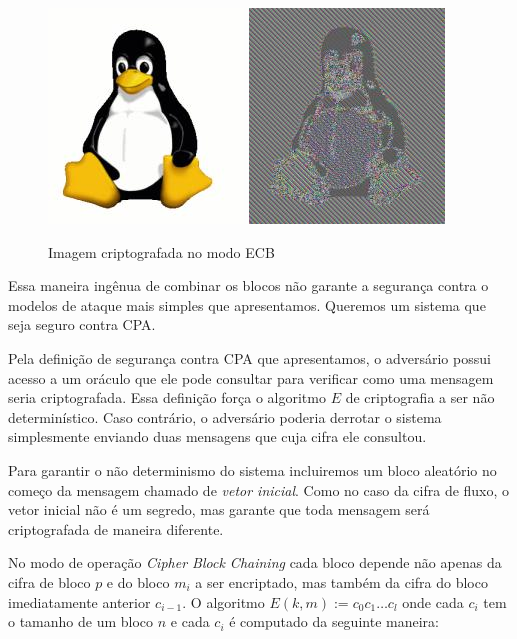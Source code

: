 
\begin{figure}[!htp]
  \centering
  \includegraphics[width=.3\textwidth]{imagens/Tux.jpg}
  \includegraphics[width=.3\textwidth]{imagens/Tux_ecb.jpg}
  \caption{Imagem criptografada no modo ECB}
\end{figure}

Essa maneira ingênua de combinar os blocos não garante a segurança contra o modelos de ataque mais simples que apresentamos.
Queremos um sistema que seja seguro contra CPA.

Pela definição de segurança contra CPA que apresentamos, o adversário possui acesso a um oráculo que ele pode consultar para verificar como uma mensagem seria criptografada.
Essa definição força o algoritmo $E$ de criptografia a ser não determinístico.
Caso contrário, o adversário poderia derrotar o sistema simplesmente enviando duas mensagens que cuja cifra ele consultou.

Para garantir o não determinismo do sistema incluiremos um bloco aleatório no começo da mensagem chamado de {\em vetor inicial}.
Como no caso da cifra de fluxo, o vetor inicial não é um segredo, mas garante que toda mensagem será criptografada de maneira diferente.

No modo de operação {\em Cipher Block Chaining} cada bloco depende não apenas da cifra de bloco $p$ e do bloco $m_i$ a ser encriptado, mas também da cifra do bloco imediatamente anterior $c_{i-1}$.
O algoritmo $E(k,m) := c_0 c_1 \dots c_l$ onde cada $c_i$ tem o tamanho de um bloco $n$ e cada $c_i$ é computado da seguinte maneira:

